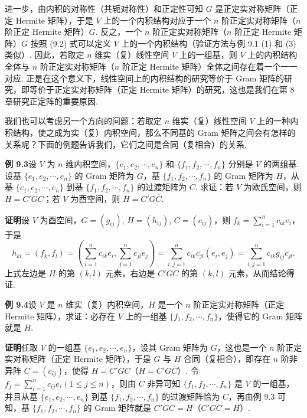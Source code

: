 \documentclass[UTF8,12pt,a4paper,fontset=fandol]{ctexart}
\begin{document}
进一步，由内积的对称性（共轭对称性）和正定性可知 $G$ 是正定实对称矩阵（正定 Hermite 矩阵），于是 $V$ 上的一个内积结构对应于一个 $n$ 阶正定实对称矩阵（$n$ 阶正定 Hermite 矩阵）$G$. 反之，一个 $n$ 阶正定实对称矩阵（$n$ 阶正定 Hermite 矩阵）$G$ 按照 (9.2) 式可以定义 $V$ 上的一个内积结构（验证方法与例 9.1 (1) 和 (3) 类似）. 因此，若取定 $n$ 维实（复）线性空间 $V$ 上的一组基，则 $V$ 上的内积结构全体与 $n$ 阶正定实对称矩阵（$n$ 阶正定 Hermite 矩阵）全体之间存在着一个一一对应. 正是在这个意义下，线性空间上的内积结构的研究等价于 Gram 矩阵的研究，即等价于正定实对称矩阵（正定 Hermite 矩阵）的研究，这也是我们在第 8 章研究正定阵的重要原因.

我们也可以考虑另一个方向的问题：若取定 $n$ 维实（复）线性空间 $V$ 上的一种内积结构，使之成为实（复）内积空间，那么不同基的 Gram 矩阵之间会有怎样的关系呢？下面的例题告诉我们，它们之间是合同（复相合）的关系.

\noindent\textbf{例 9.3}\quad 设 $V$ 为 $n$ 维内积空间，$\{e_1,e_2,\cdots,e_n\}$ 和 $\{f_1,f_2,\cdots,f_n\}$ 分别是 $V$ 的两组基. 设基 $\{e_1,e_2,\cdots,e_n\}$ 的 Gram 矩阵为 $G$，基 $\{f_1,f_2,\cdots,f_n\}$ 的 Gram 矩阵为 $H$，从基 $\{e_1,e_2,\cdots,e_n\}$ 到基 $\{f_1,f_2,\cdots,f_n\}$ 的过渡矩阵为 $C$. 求证：若 $V$ 为欧氏空间，则 $H=C'GC$；若 $V$ 为酉空间，则 $H=C'G\overline{C}$.

\noindent\textbf{证明}\quad 设 $V$ 为酉空间，$G=(g_{ij})$, $H=(h_{ij})$, $C=(c_{ij})$，则 $f_k=\sum_{i=1}^n c_{ik}e_i$，于是
\[
h_{kl}=(f_k,f_l)=\left(\sum_{i=1}^n c_{ik}e_i,\sum_{j=1}^n c_{jl}e_j\right)
=\sum_{i,j=1}^n c_{ik}\overline{c_{jl}}(e_i,e_j)
=\sum_{i,j=1}^n c_{ik}g_{ij}\overline{c_{jl}}.
\]
上式左边是 $H$ 的第 $(k,l)$ 元素，右边是 $C'G\overline{C}$ 的第 $(k,l)$ 元素，从而结论得证.

\noindent\textbf{例 9.4}\quad 设 $V$ 是 $n$ 维实（复）内积空间，$H$ 是一个 $n$ 阶正定实对称矩阵（正定 Hermite 矩阵），求证：必存在 $V$ 上的一组基 $\{f_1,f_2,\cdots,f_n\}$，使得它的 Gram 矩阵就是 $H$.

\noindent\textbf{证明}\quad 任取 $V$ 的一组基 $\{e_1,e_2,\cdots,e_n\}$，设其 Gram 矩阵为 $G$，这也是一个 $n$ 阶正定实对称矩阵（正定 Hermite 矩阵），于是 $G$ 与 $H$ 合同（复相合），即存在 $n$ 阶非异阵 $C=(c_{ij})$，使得 $H=C'GC$（$H=C'G\overline{C}$）. 令 $f_j=\sum_{i=1}^n c_{ij}e_i(1\le j\le n)$，则由 $C$ 非异可知 $\{f_1,f_2,\cdots,f_n\}$ 是 $V$ 的一组基，并且从基 $\{e_1,e_2,\cdots,e_n\}$ 到基 $\{f_1,f_2,\cdots,f_n\}$ 的过渡矩阵恰为 $C$，再由例 9.3 可知，基 $\{f_1,f_2,\cdots,f_n\}$ 的 Gram 矩阵就是 $C'GC=H$（$C'G\overline{C}=H$）.
\end{document}
